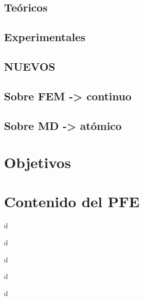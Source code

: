 
\subsection{Teóricos}
\label{S1_2_1}


\subsection{Experimentales}
\label{S1_2_2}


\subsection{NUEVOS}
\label{S1_2_3}


\subsection{Sobre FEM -> continuo}
\label{S1_2_4}


\subsection{Sobre MD -> atómico}
\label{S1_2_5}


\section{Objetivos}
\label{S1_3}


\section{Contenido del PFE}
\label{S1_4}

d

d

d

d

d